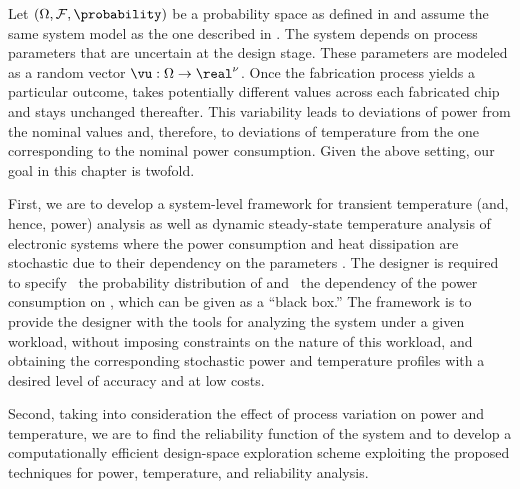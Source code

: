 Let $(\Omega, \mathcal{F}, \probability)$ be a probability space as defined in
 and assume the same system model as the one described
in . The system depends on \nu process parameters that are
uncertain at the design stage. These parameters are modeled as a random vector
$\vu: \Omega \to \real^\nu$. Once the fabrication process yields a particular
outcome, \vu takes potentially different values across each fabricated chip and
stays unchanged thereafter. This variability leads to deviations of power from
the nominal values and, therefore, to deviations of temperature from the one
corresponding to the nominal power consumption. Given the above setting, our
goal in this chapter is twofold.

First, we are to develop a system-level framework for transient temperature
(and, hence, power) analysis as well as dynamic steady-state temperature
analysis of electronic systems where the power consumption and heat dissipation
are stochastic due to their dependency on the parameters \vu. The designer is
required to specify \one~the probability distribution of \vu and \two~the
dependency of the power consumption on \vu, which can be given as a ``black
box.'' The framework is to provide the designer with the tools for analyzing the
system under a given workload, without imposing constraints on the nature of
this workload, and obtaining the corresponding stochastic power \mp and
temperature \mq profiles with a desired level of accuracy and at low costs.

Second, taking into consideration the effect of process variation on power and
temperature, we are to find the reliability function of the system and to
develop a computationally efficient design-space exploration scheme exploiting
the proposed techniques for power, temperature, and reliability analysis.
